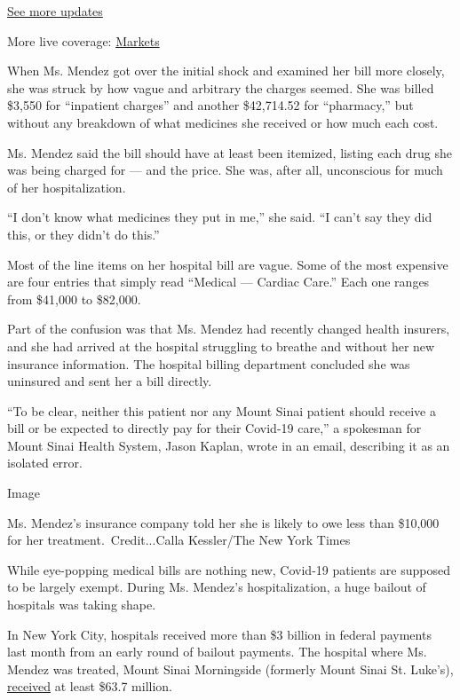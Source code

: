 \href{https://www.nytimes.com/2020/08/04/world/coronavirus-cases.html?action=click\&pgtype=Article\&state=default\&region=MAIN_CONTENT_1\&context=storylines_live_updates}{See
more updates}

More live coverage:
\href{https://www.nytimes.com/live/2020/08/04/business/stock-market-today-coronavirus?action=click\&pgtype=Article\&state=default\&region=MAIN_CONTENT_1\&context=storylines_live_updates}{Markets}

When Ms. Mendez got over the initial shock and examined her bill more
closely, she was struck by how vague and arbitrary the charges seemed.
She was billed \$3,550 for ``inpatient charges'' and another \$42,714.52
for ``pharmacy,'' but without any breakdown of what medicines she
received or how much each cost.

Ms. Mendez said the bill should have at least been itemized, listing
each drug she was being charged for --- and the price. She was, after
all, unconscious for much of her hospitalization.

``I don't know what medicines they put in me,'' she said. ``I can't say
they did this, or they didn't do this.''

Most of the line items on her hospital bill are vague. Some of the most
expensive are four entries that simply read ``Medical --- Cardiac
Care.'' Each one ranges from \$41,000 to \$82,000.

Part of the confusion was that Ms. Mendez had recently changed health
insurers, and she had arrived at the hospital struggling to breathe and
without her new insurance information. The hospital billing department
concluded she was uninsured and sent her a bill directly.

``To be clear, neither this patient nor any Mount Sinai patient should
receive a bill or be expected to directly pay for their Covid-19 care,''
a spokesman for Mount Sinai Health System, Jason Kaplan, wrote in an
email, describing it as an isolated error.

Image

Ms. Mendez's insurance company told her she is likely to owe less than
\$10,000 for her treatment.~Credit...Calla Kessler/The New York Times

While eye-popping medical bills are nothing new, Covid-19 patients are
supposed to be largely exempt. During Ms. Mendez's hospitalization, a
huge bailout of hospitals was taking shape.

In New York City, hospitals received more than \$3 billion in federal
payments last month from an early round of bailout payments. The
hospital where Ms. Mendez was treated, Mount Sinai Morningside (formerly
Mount Sinai St. Luke's),
\href{https://data.cdc.gov/Administrative/Provider-Relief-Fund-COVID-19-High-Impact-Payments/b58h-s9zx/data}{received}
at least \$63.7 million.

